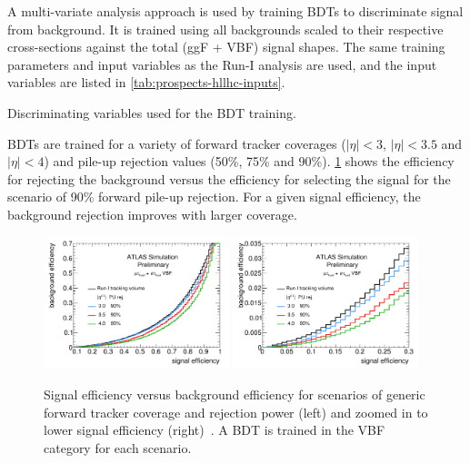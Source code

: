 A multi-variate analysis approach is used by training BDTs to discriminate signal from background. It is trained using all backgrounds scaled to their respective cross-sections against the total (ggF + VBF) signal shapes. The same training parameters and input variables as the Run-I analysis are used, and the input variables are listed in \cref{tab:prospects-hllhc-inputs}.

\begin{table}[bp]
  \centering
  \renewcommand{\arraystretch}{1.4}
  \caption{Discriminating variables used for the BDT training.}
  
  \label{tab:prospects-hllhc-inputs}
\end{table}

BDTs are trained for a variety of forward tracker coverages ($|\eta| < 3$, $|\eta| < 3.5$ and $|\eta| < 4$) and pile-up rejection values (50\%, 75\% and 90\%). \cref{fig:prospects-hllhc-rocs} shows the efficiency for rejecting the background versus the efficiency for selecting the signal for the scenario of 90\% forward pile-up rejection. For a given signal efficiency, the background rejection improves with larger coverage.

\begin{figure}[tp]
  \centering
  \includegraphics[width=0.48\textwidth]{figures/ATL-PHYS-PUB-2014-018/fig_02a}
  \includegraphics[width=0.48\textwidth]{figures/ATL-PHYS-PUB-2014-018/fig_02b}
  \caption{Signal efficiency versus background efficiency for scenarios of generic forward tracker coverage and rejection power (left) and zoomed in to lower signal efficiency (right)~\cite{ATL-PHYS-PUB-2014-018}. A BDT is trained in the VBF category for each scenario.}
  \label{fig:prospects-hllhc-rocs}
\end{figure}

